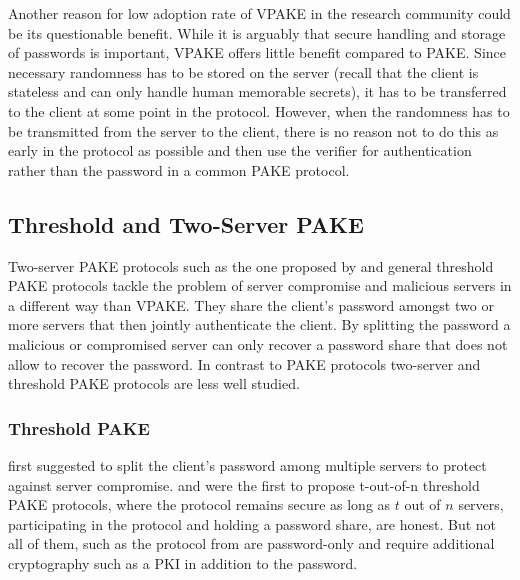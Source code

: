 Another reason for low adoption rate of \ac{VPAKE} in the research community could be its questionable benefit.
While it is arguably that secure handling and storage of passwords is important, \ac{VPAKE} offers little benefit compared to \ac{PAKE}.
Since necessary randomness has to be stored on the server (recall that the client is stateless and can only handle human memorable secrets), it has to be transferred to the client at some point in the protocol.
However, when the randomness has to be transmitted from the server to the client, there is no reason not to do this as early in the protocol as possible and then use the verifier for authentication rather than the password in a common \ac{PAKE} protocol.


\subsection{Threshold and Two-Server PAKE}
Two-server PAKE protocols such as the one proposed by \citet{Abdalla2005} and general threshold \ac{PAKE} protocols \cite{MacKenzieSJ02,RaimondoG03,Abdalla2005b} tackle the problem of server compromise and malicious servers in a different way than \ac{VPAKE}.
They share the client's password amongst two or more servers that then jointly authenticate the client.
By splitting the password a malicious or compromised server can only recover a password share that does not allow to recover the password.
In contrast to \ac{PAKE} protocols two-server and threshold \ac{PAKE} protocols are less well studied.

\subsubsection{Threshold PAKE}
\citet{FordK00} first suggested to split the client's password among multiple servers to protect against server compromise.
\citet{RaimondoG03} and \citet{MacKenzieSJ02} were the first to propose t-out-of-n threshold \ac{PAKE} protocols, where the protocol remains secure as long as $t$ out of $n$ servers, participating in the protocol and holding a password share, are honest.
But not all of them, such as the protocol from \citet{MacKenzieSJ02} are password-only and require additional cryptography such as a PKI in addition to the password.

